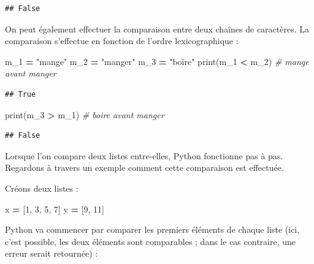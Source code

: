 \documentclass[
  12pt,
]{book}
\newenvironment{Shaded}{\begin{snugshade}}{\end{snugshade}}
\newcommand{\BuiltInTok}[1]{#1}
\newcommand{\CommentTok}[1]{\textcolor[rgb]{0.56,0.35,0.01}{\textit{#1}}}
\newcommand{\DecValTok}[1]{\textcolor[rgb]{0.00,0.00,0.81}{#1}}
\newcommand{\NormalTok}[1]{#1}
\newcommand{\OperatorTok}[1]{\textcolor[rgb]{0.81,0.36,0.00}{\textbf{#1}}}
\newcommand{\StringTok}[1]{\textcolor[rgb]{0.31,0.60,0.02}{#1}}
\numberwithin{equation}{section}
\numberwithin{countremarque}{section}
\begin{document}
\begin{lstlisting}
## False
\end{lstlisting}

On peut également effectuer la comparaison entre deux chaînes de caractères. La comparaison s'effectue en fonction de l'ordre lexicographique :

\begin{Shaded}
\begin{Highlighting}[]
\NormalTok{m\_1 }\OperatorTok{=} \StringTok{"mange"}
\NormalTok{m\_2 }\OperatorTok{=} \StringTok{"manger"}
\NormalTok{m\_3 }\OperatorTok{=} \StringTok{"boire"}
\BuiltInTok{print}\NormalTok{(m\_1 }\OperatorTok{\textless{}}\NormalTok{ m\_2) }\CommentTok{\# mange avant manger}
\end{Highlighting}
\end{Shaded}

\begin{lstlisting}
## True
\end{lstlisting}

\begin{Shaded}
\begin{Highlighting}[]
\BuiltInTok{print}\NormalTok{(m\_3 }\OperatorTok{\textgreater{}}\NormalTok{ m\_1) }\CommentTok{\# boire avant manger}
\end{Highlighting}
\end{Shaded}

\begin{lstlisting}
## False
\end{lstlisting}

Lorsque l'on compare deux listes entre-elles, Python fonctionne pas à pas. Regardons à travers un exemple comment cette comparaison est effectuée.

Créons deux listes :

\begin{Shaded}
\begin{Highlighting}[]
\NormalTok{x }\OperatorTok{=}\NormalTok{ [}\DecValTok{1}\NormalTok{, }\DecValTok{3}\NormalTok{, }\DecValTok{5}\NormalTok{, }\DecValTok{7}\NormalTok{]}
\NormalTok{y }\OperatorTok{=}\NormalTok{ [}\DecValTok{9}\NormalTok{, }\DecValTok{11}\NormalTok{]}
\end{Highlighting}
\end{Shaded}

Python va commencer par comparer les premiers éléments de chaque liste (ici, c'est possible, les deux éléments sont comparables ; dans le cas contraire, une erreur serait retournée) :
\end{document}
